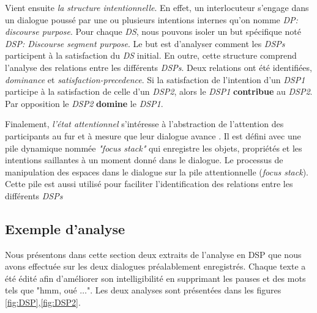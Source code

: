 			Vient ensuite \emph{la structure intentionnelle}. En effet, un interlocuteur s'engage dans un dialogue poussé par une ou plusieurs intentions internes qu'on nomme \emph{DP: discourse purpose}. Pour chaque \emph{DS}, nous pouvons isoler un but spécifique noté \emph{DSP: Discourse segment purpose}. Le but est d'analyser comment les\emph{ DSPs} participent à la satisfaction du \emph{DS} initial. En outre, cette structure comprend l'analyse des relations entre les différents \emph{DSPs}. Deux relations ont été identifiées, \emph{dominance} et \emph{satisfaction-precedence}. Si la satisfaction de l'intention d'un \emph{DSP1} participe à la satisfaction de celle d'un \emph{DSP2}, alors le \emph{DSP1} \textbf{contribue} au \emph{DSP2}. Par opposition le \emph{DSP2} \textbf{domine} le \emph{DSP1}.
	
			
			Finalement, \emph{l'état attentionnel} s'intéresse à l'abstraction de l'attention des participants au fur et à mesure que leur dialogue avance \cite{sidner1994artificial}. Il est défini avec une pile dynamique nommée \emph{"focus stack"} qui enregistre les objets, propriétés et les intentions saillantes  à un moment donné dans le dialogue. Le processus de manipulation des espaces dans le dialogue sur la pile attentionnelle (\emph{focus stack}). Cette pile est aussi utilisé pour faciliter l'identification des relations entre les différents \emph{DSPs}
			

		 \subsection{Exemple d'analyse}
			 Nous présentons dans cette section deux extraits de l'analyse en DSP que nous avons effectuée sur les deux dialogues préalablement enregistrés. Chaque texte a été édité afin d'améliorer son intelligibilité en supprimant les pauses et des mots tels que "hmm, oué $\ldots$".
			 Les deux analyses sont présentées dans les figures \ref{fig:DSP},\ref{fig:DSP2}.
			 
